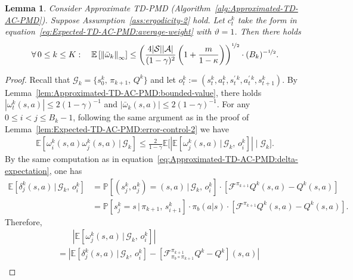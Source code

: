 \documentclass[10pt]{article}
\newcommand{\calA}{\mathcal{A}}
\newcommand{\calS}{\mathcal{S}}
\newcommand{\calF}{\mathcal{F}}
\newcommand{\calG}{\mathcal{G}}
\newcommand{\E}{\mathbb{E}}
\renewcommand{\P}{\mathbb{P}}
\newcommand{\ls}{\left}
\newcommand{\rs}{\right}
\theoremstyle{plain}
\newtheorem{lemma}[theorem]{Lemma}
\theoremstyle{definition}
\begin{document}
\begin{lemma}
    Consider Approximate TD-PMD \textup{(}Algorithm~\ref{alg:Approximated-TD-AC-PMD}\textup{)}. Suppose Assumption~\ref{ass:ergodicity-2} hold. Let $c_t^k$ take the form in equation~\eqref{eq:Expected-TD-AC-PMD:average-weight} with $\vartheta=1$. Then there holds
    \begin{align*}
        \forall\, 0 \leq k \leq K : \quad \E\ls[ \ls\| \bar\omega_k \rs\|_\infty \rs] \leq \ls( \frac{4|\calS||\calA|}{(1-\gamma)^2} \ls( 1+\frac{m}{1-\kappa} \rs) \rs)^{\nicefrac{1}{2}} \cdot (B_k)^{-\nicefrac{1}{2}}.
    \end{align*}
    \label{lem:Approximated-TD-AC-PMD:error-control-2}
\end{lemma}

\begin{proof}
    Recall that $\calG_k = \{ s_0^k, \, \pi_{k+1}, \, Q^k \}$ and let $o_t^k := (s_t^k, a_t^k, s_t^{\prime\,k}, a_t^{\prime\,k}, s_{t+1}^k)$. By Lemma~\ref{lem:Approximated-TD-AC-PMD:bounded-value}, there holds $|\omega_t^k(s,a)| \leq 2(1-\gamma)^{-1}$ and $|\bar\omega_k(s,a)| \leq 2 (1-\gamma)^{-1}$. For any $0 \leq i < j \leq B_k-1$, following the same argument as in the proof of Lemma~\ref{lem:Expected-TD-AC-PMD:error-control-2} we have
    \begin{align*}
        \E\ls[ \omega_i^k(s,a) \omega_j^k(s,a) \, \big | \, \calG_k \rs] \leq \frac{2}{1-\gamma} \E \Bigg [ \ls| \E\ls[ \omega_j^k(s,a) \, \big | \, \calG_k, \, o_i^k \rs] \rs| \; \Bigg | \; \calG_k \Bigg].
    \end{align*}
    By the same computation as in equation~\eqref{eq:Approximated-TD-AC-PMD:delta-expectation}, one has 
    \begin{align*}
        \E\ls[ \delta_j^k(s,a) \, \big | \, \calG_k, \, o_i^k \rs] &= \P\ls[ (s_j^k, a_j^k) = (s,a) \, \big | \, \calG_k, \, o_i^k \rs] \cdot \ls[ \calF^{\pi_{k+1}} Q^k(s,a) - Q^k(s,a) \rs] \\
        &= \P \ls[ s_j^k = s \, \big | \, \pi_{k+1}, \, s_{i+1}^k \rs] \cdot \pi_b(a|s) \cdot \ls[ \calF^{\pi_{k+1}} Q^k(s,a) - Q^k(s,a) \rs].
    \end{align*}
    Therefore,
    \begin{align*}
        &\phantom{=\,\,\,}\ls| \E\ls[ \omega_j^k(s,a) \, | \, \calG_k, \, o_i^k \rs] \rs| \\
        &= \ls| \E\ls[ \delta_j^k(s,a) \, | \, \calG_k, \, o_i^k \rs] - \ls[ \calF^{\pi_{k+1}}_{\pi_b\circ\pi_{k+1}} Q^k - Q^k \rs](s,a) \rs| \\

\end{align*}
\end{proof}
\end{document}
